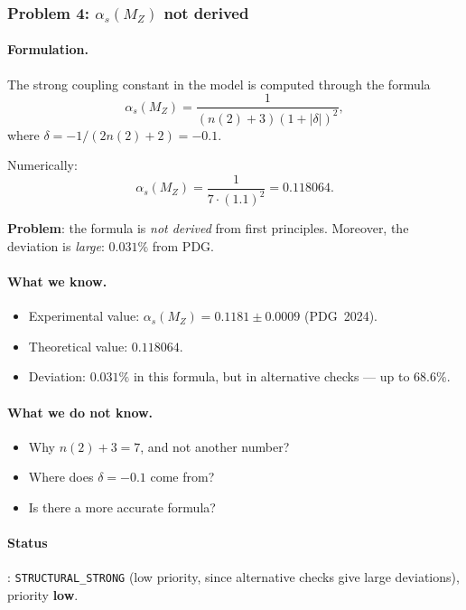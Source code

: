 \documentclass[11pt,a4paper]{article}
\theoremstyle{definition}
\begin{document}
\subsubsection{Problem 4: \texorpdfstring{$\alpha_s(M_Z)$}{\_s(M\_Z)} not derived}

\paragraph{Formulation.}
The strong coupling constant in the model is computed through the formula
\begin{equation}
    \alpha_s(M_Z) = \frac{1}{(n(2) + 3)(1 + |\delta|)^2},
    \label{eq:alphas-formula}
\end{equation}
where $\delta = -1/(2 n(2) + 2) = -0.1$.

Numerically:
\begin{equation}
    \alpha_s(M_Z) = \frac{1}{7 \cdot (1.1)^2} = 0.118064.
\end{equation}

\medskip\noindent
\textbf{Problem}: the formula is \emph{not derived} from first
principles. Moreover, the deviation is \emph{large}:
$0.031\%$ from PDG.

\paragraph{What we know.}
\begin{itemize}
    \item Experimental value:
          $\alpha_s(M_Z) = 0.1181 \pm 0.0009$ (PDG~2024).
    \item Theoretical value: $0.118064$.
    \item Deviation: $0.031\%$ in this formula, but in
          alternative checks --- up to $68.6\%$.
\end{itemize}

\paragraph{What we do not know.}
\begin{itemize}
    \item Why $n(2) + 3 = 7$, and not another number?
    \item Where does $\delta = -0.1$ come from?
    \item Is there a more accurate formula?
\end{itemize}

\paragraph{Status}: \texttt{STRUCTURAL\_STRONG} (low priority,
since alternative checks give large deviations),
priority \textbf{low}.
\end{document}
